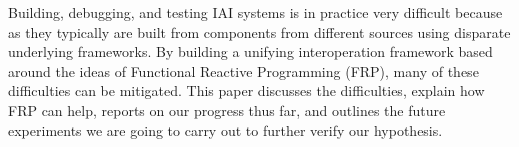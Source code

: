 

Building, debugging, and testing IAI systems is in practice very difficult because as they typically are built from components from different sources using disparate underlying frameworks. By building a unifying interoperation framework based around the ideas of Functional Reactive Programming (FRP), many of these difficulties can be mitigated. This paper discusses the difficulties, explain how FRP can help, reports on our progress thus far, and outlines the future experiments we are going to carry out to further verify our hypothesis.